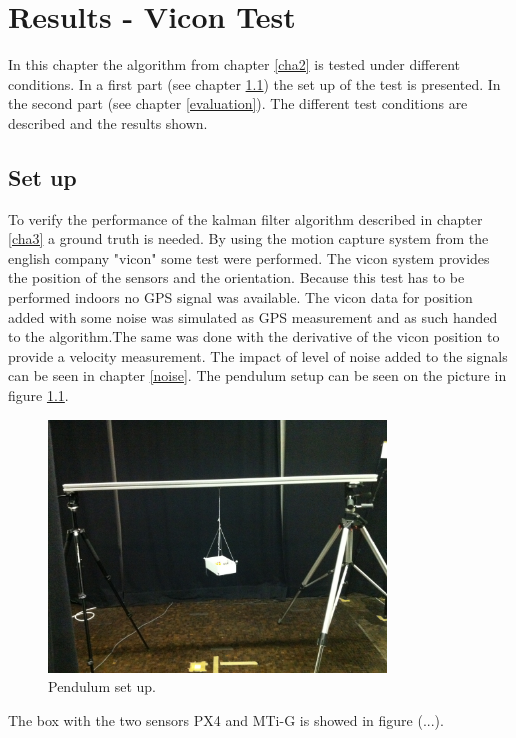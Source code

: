 \chapter{Results - Vicon Test}\label{cha4}
In this chapter the algorithm from chapter \ref{cha2} is tested under different conditions. In a first part (see chapter \ref{setup}) the set up of the test is presented. In the second part (see chapter \ref{evaluation}). The different test conditions are described and the results shown.
\section{Set up}\label{setup}
To verify the performance of the kalman filter algorithm described in chapter \ref{cha3} a ground truth is needed.  By using the motion capture system from the english company "vicon" some test were performed. The vicon system provides the position of the sensors and the orientation. Because this test has to be performed indoors no GPS signal was available. The vicon data for position added with some noise was simulated as GPS measurement and as such handed to the algorithm.The same was done with the derivative of the vicon position to provide a velocity measurement. The impact of level of noise added to the signals can be seen in chapter \ref{noise}.
The pendulum setup can be seen on the picture in figure \ref{pend_setup}. 
\begin{figure}[h]
\centering
\includegraphics[width=0.8\textwidth]{vicon_bilder/IMG_0137.JPG}
\caption{Pendulum set up.}
\label{pend_setup}
\end{figure}
The box with the two sensors PX4 and MTi-G is showed in figure (...).
